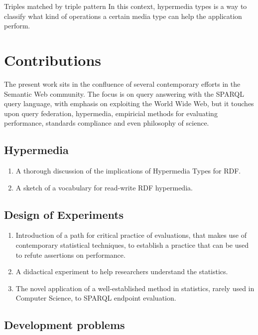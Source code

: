 \begin{example}{Triples matched by triple pattern}
In this context, hypermedia types is a way to classify what kind of
operations a certain media type can help the application perform.

\section{Contributions}\label{sec:contribsum}

The present work sits in the confluence of several contemporary
efforts in the Semantic Web community. The focus is on query answering
with the SPARQL query language, with emphasis on exploiting the World
Wide Web, but it touches upon query federation, hypermedia, empiricial
methods for evaluating performance, standards compliance and even
philosophy of science. 


\subsection{Hypermedia}

\begin{enumerate}
\item A thorough discussion of the implications of Hypermedia
  Types\cite{hypermediatypes} for RDF.
\item A sketch of a vocabulary for read-write RDF hypermedia.
\end{enumerate}

\subsection{Design of Experiments}

\begin{enumerate}
\item Introduction of a path for critical practice of evaluations, that makes
  use of contemporary statistical techniques, to establish a practice
  that can be used to refute assertions on performance.
\item A didactical experiment to help researchers understand the statistics.
\item The novel application of a well-established method in
  statistics, rarely used in Computer Science, to SPARQL endpoint
  evaluation.
  
\end{enumerate}

\subsection{Development problems}


\end{example}
